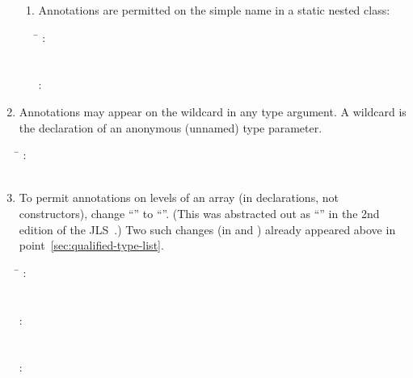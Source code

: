 \documentclass[10pt]{article}
\begin{document}
\begin{enumerate}
\begin{enumerate}
% 



\item
Annotations are permitted on the simple name in a static nested class:

\begin{tabbing}
\qquad \= \kill
{}: \\
\qquad {} \\
 \\
: \\
\qquad            {}  
\end{tabbing}
\end{enumerate}

\item
Annotations may appear on the wildcard in any type argument.
A wildcard is the declaration of an anonymous (unnamed) type parameter.

\begin{tabbing}
\qquad \= \kill
{}: \\
\qquad            {} \ 
\end{tabbing}


\item
To permit annotations on levels of an array (in declarations, not
constructors), change ``\multi{\term{[]}}''  to
``''.
(This was abstracted out as
``'' in the 2nd edition of the JLS~\cite{GoslingJSB2000}.)
Two such changes (in  and
) already appeared above in
point~\ref{sec:qualified-type-list}.

\begin{tabbing}
\qquad \= \kill
{}: \\
\qquad        {}  \\
 \\
: \\
\qquad       {}  \\
 \\
: \\
\qquad        {} 
\end{tabbing}


\end{enumerate}
\end{document}
